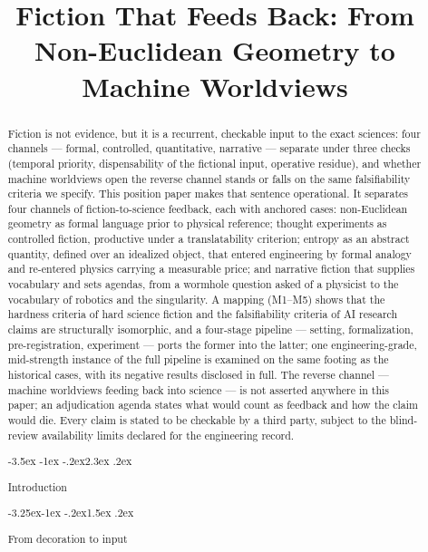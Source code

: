 \documentclass[11pt,a4paper]{article}
\title{Fiction That Feeds Back: From Non-Euclidean Geometry to Machine Worldviews}
\author{}
\date{}
\makeatletter
\renewcommand\section{\@startsection{section}{1}{\z@}%
  {-3.5ex \@plus -1ex \@minus -.2ex}{2.3ex \@plus .2ex}%
  {\normalfont\Large\bfseries\raggedright}}
\renewcommand\subsection{\@startsection{subsection}{2}{\z@}%
  {-3.25ex\@plus -1ex \@minus -.2ex}{1.5ex \@plus .2ex}%
  {\normalfont\large\bfseries\raggedright}}
\makeatother
\begin{document}
\maketitle
\thispagestyle{empty}

\begin{abstract}


Fiction is not evidence, but it is a recurrent, checkable input to the exact sciences: four channels — formal, controlled, quantitative, narrative — separate under three checks (temporal priority, dispensability of the fictional input, operative residue), and whether machine worldviews open the reverse channel stands or falls on the same falsifiability criteria we specify. This position paper makes that sentence operational. It separates four channels of fiction-to-science feedback, each with anchored cases: non-Euclidean geometry as formal language prior to physical reference; thought experiments as controlled fiction, productive under a translatability criterion; entropy as an abstract quantity, defined over an idealized object, that entered engineering by formal analogy and re-entered physics carrying a measurable price; and narrative fiction that supplies vocabulary and sets agendas, from a wormhole question asked of a physicist to the vocabulary of robotics and the singularity. A mapping (M1–M5) shows that the hardness criteria of hard science fiction and the falsifiability criteria of AI research claims are structurally isomorphic, and a four-stage pipeline — setting, formalization, pre-registration, experiment — ports the former into the latter; one engineering-grade, mid-strength instance of the full pipeline is examined on the same footing as the historical cases, with its negative results disclosed in full. The reverse channel — machine worldviews feeding back into science — is not asserted anywhere in this paper; an adjudication agenda states what would count as feedback and how the claim would die. Every claim is stated to be checkable by a third party, subject to the blind-review availability limits declared for the engineering record.

\section{Introduction}

\subsection{From decoration to input}


\end{abstract}
\end{document}
